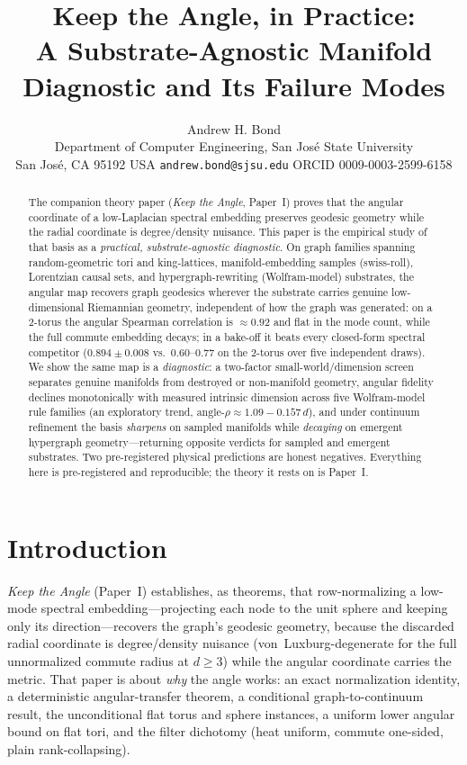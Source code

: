 \documentclass[11pt]{article}
\title{Keep the Angle, in Practice:\\
A Substrate-Agnostic Manifold Diagnostic and Its Failure Modes}
\author{Andrew H. Bond\\
\small Department of Computer Engineering, San Jos\'e State University\\
\small San Jos\'e, CA 95192 USA \quad \texttt{andrew.bond@sjsu.edu} \quad ORCID 0009-0003-2599-6158}
\date{}
\begin{document}
\maketitle

\begin{abstract}
The companion theory paper (\emph{Keep the Angle}, Paper~I) proves that the angular
coordinate of a low-Laplacian spectral embedding preserves geodesic geometry while the
radial coordinate is degree/density nuisance. This paper is the empirical study of that
basis as a \emph{practical, substrate-agnostic diagnostic}. On graph families spanning
random-geometric tori and king-lattices, manifold-embedding samples (swiss-roll),
Lorentzian causal sets, and hypergraph-rewriting (Wolfram-model) substrates, the angular
map recovers graph geodesics wherever the substrate carries genuine low-dimensional
Riemannian geometry, independent of how the graph was generated: on a $2$-torus the
angular Spearman correlation is $\approx0.92$ and flat in the mode count, while the full
commute embedding decays; in a bake-off it beats every closed-form spectral competitor
($0.894\pm0.008$ vs.\ $0.60$--$0.77$ on the $2$-torus over five independent draws). We
show the same map is a \emph{diagnostic}: a two-factor small-world/dimension screen
separates genuine manifolds from destroyed or non-manifold geometry, angular fidelity
declines monotonically with measured intrinsic dimension across five Wolfram-model rule
families (an exploratory trend, $\text{angle-}\rho\approx1.09-0.157\,d$), and under
continuum refinement the basis \emph{sharpens} on sampled manifolds while \emph{decaying}
on emergent hypergraph geometry---returning opposite verdicts for sampled and emergent
substrates. Two pre-registered physical predictions are honest negatives. Everything here
is pre-registered and reproducible; the theory it rests on is Paper~I.
\end{abstract}

\section{Introduction}
\emph{Keep the Angle} (Paper~I) establishes, as theorems, that row-normalizing a
low-mode spectral embedding---projecting each node to the unit sphere and keeping only
its direction---recovers the graph's geodesic geometry, because the discarded radial
coordinate is degree/density nuisance (von~Luxburg-degenerate for the full unnormalized
commute radius at $d\ge3$) while the angular coordinate carries the metric. That paper is
about \emph{why} the angle works: an exact normalization identity, a deterministic
angular-transfer theorem, a conditional graph-to-continuum result, the unconditional flat
torus and sphere instances, a uniform lower angular bound on flat tori, and the filter
dichotomy (heat uniform, commute one-sided, plain rank-collapsing).
\end{document}
